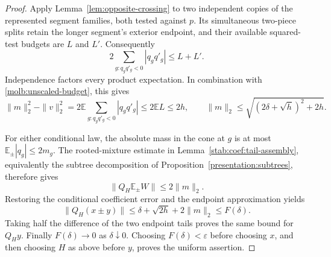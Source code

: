 \begin{proof}
Apply Lemma~\ref{lem:opposite-crossing} to two independent copies
of the represented segment families, both tested against $p$.
Its simultaneous two-piece splits retain the longer segment's
exterior endpoint, and their available squared-test budgets are
$L$ and $L'$. Consequently
\[
 2\sum_{g:q_gq'_g<0}|q_gq'_g|\le L+L'.
\]
Independence factors every product expectation. In combination with
\eqref{molb:unscaled-budget}, this gives
\begin{equation}\label{molb:unscaled-unsigned}
 \|m\|_2^2-\|v\|_2^2
 =2\mathbb E\sum_{g:q_gq'_g<0}|q_gq'_g|
 \le2\mathbb EL\le2h,
 \qquad
 \|m\|_2\le\sqrt{(2\delta+\sqrt h)^2+2h}.
\end{equation}

For either conditional law, the absolute mass in the cone at $g$
is at most $\mathbb E_\pm|q_g|\le2m_g$. The rooted-mixture
estimate in Lemma~\ref{stab:coef:tail-assembly}, equivalently the
subtree decomposition of Proposition~\ref{presentation:subtrees},
therefore gives
\begin{equation}\label{molb:unscaled-conditional}
 \|Q_H\mathbb E_\pm W\|\le2\|m\|_2.
\end{equation}
Restoring the conditional coefficient error and the endpoint
approximation yields
\[
 \|Q_H(x\pm y)\|
 \le\delta+\sqrt{2h}+2\|m\|_2
 \le F(\delta).
\]
Taking half the difference of the two endpoint tails proves the
same bound for $Q_Hy$. Finally $F(\delta)\to0$ as
$\delta\downarrow0$. Choosing $F(\delta)<\varepsilon$ before
choosing $x$, and then choosing $H$ as above before $y$, proves
the uniform assertion.
\end{proof}
